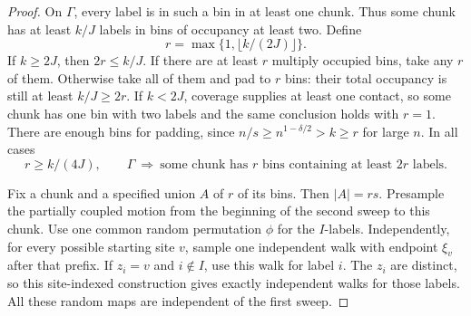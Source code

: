 \begin{proof}
On $\Gamma$, every label is in such a bin in at least one
chunk.  Thus some chunk has at least $k/J$ labels in bins
of occupancy at least two.  Define
\[
 r=\max\{1,\lfloor k/(2J)\rfloor\}.
\]
If $k\ge2J$, then $2r\le k/J$.  If there are at least $r$
multiply occupied bins, take any $r$ of them.  Otherwise take
all of them and pad to $r$ bins: their total occupancy is
still at least $k/J\ge2r$.  If $k<2J$, coverage supplies
at least one contact, so some chunk has one bin with two
labels and the same conclusion holds with $r=1$.
There are enough bins for padding, since
$n/s\ge n^{1-\delta/2}>k\ge r$ for large $n$.
In all cases
\begin{equation}\label{rec:chunk-selected-bins}
 r\ge k/(4J),\qquad
 \Gamma\ \Longrightarrow\
 \text{some chunk has $r$ bins containing at least $2r$ labels}.
\end{equation}

Fix a chunk and a specified union $A$ of $r$ of its bins.
Then $|A|=rs$.  Presample the partially coupled motion
from the beginning of the second sweep to this chunk.
Use one common random permutation $\phi$ for the $I$-labels.
Independently, for every possible starting site $v$, sample
one independent walk with endpoint $\xi_v$ after that prefix.
If $z_i=v$ and $i\notin I$, use this walk for label $i$.
The $z_i$ are distinct, so this site-indexed construction
gives exactly independent walks for those labels.
All these random maps are independent of the first sweep.


\end{proof}
